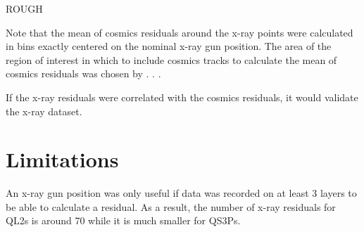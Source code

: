 ROUGH

Note that the mean of cosmics residuals around the x-ray points were calculated in bins exactly centered on the nominal x-ray gun position. The area of the region of interest in which to include cosmics tracks to calculate the mean of cosmics residuals was chosen by . . . 

If the x-ray residuals were correlated with the cosmics residuals, it would validate the x-ray dataset.



\section{Limitations}
An x-ray gun position was only useful if data was recorded on at least 3 layers to be able to calculate a residual. As a result, the number of x-ray residuals for QL2s is around 70 while it is much smaller for QS3Ps.

